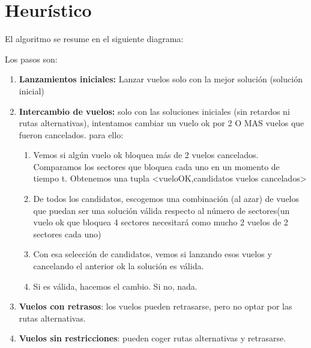 \section{Heurístico}
El algoritmo se resume en el siguiente diagrama:

Los pasos son:
\begin{enumerate}
	\item \textbf{Lanzamientos iniciales:} Lanzar vuelos solo con la mejor solución (solución inicial)
	\item \textbf{Intercambio de vuelos: }solo con las soluciones iniciales (sin retardos ni rutas alternativas), intentamos cambiar un vuelo ok por 2 O MAS vuelos que fueron cancelados. para ello:
	\begin{enumerate}
		\item Vemos si algún vuelo ok bloquea más de 2 vuelos cancelados. Comparamos los sectores que bloquea cada uno en un momento de tiempo t. Obtenemos una tupla <vueloOK,candidatos vuelos cancelados>
		\item De todos los candidatos, escogemos una combinación (al azar) de vuelos que puedan ser una solución válida respecto al número de sectores(un vuelo ok que bloquea 4 sectores necesitará como mucho 2 vuelos de 2 sectores cada uno)
		\item Con esa selección de candidatos, vemos si lanzando esos vuelos y cancelando el anterior ok la solución es válida.
		\item Si es válida, hacemos el cambio. Si no, nada.
	\end{enumerate} 
	
	\item \textbf{Vuelos con retrasos}: los vuelos pueden retrasarse, pero no optar por las rutas alternativas.
	\item \textbf{Vuelos sin restricciones}: pueden coger rutas alternativas y retrasarse.
\end{enumerate}